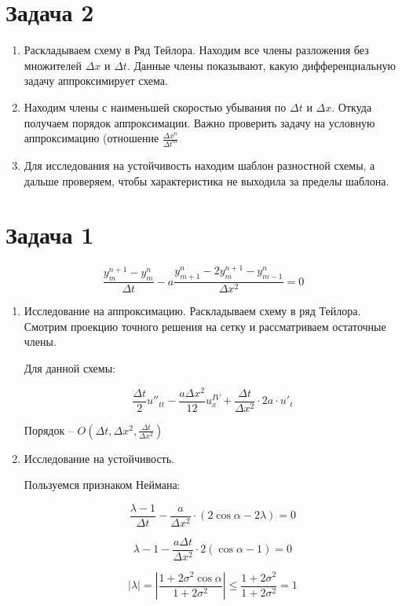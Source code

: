 \documentclass[10pt,a4paper]{article}
\begin{document}
	\section{Задача 2}
	
		\begin{enumerate}
			\item Раскладываем схему в Ряд Тейлора. Находим все члены разложения
			без множителей $\Delta x$ и $\Delta t$. Данные члены показывают, 
			какую дифференциальную задачу аппроксимирует схема.
			\item Находим члены с наименьшей скоростью убывания по $\Delta t$ и 
			$\Delta x$. Откуда получаем порядок аппроксимации. Важно проверить 
			задачу на условную аппроксимацию (отношение $\frac{\Delta x^{n}}
			{\Delta t^{m}}$
			\item Для исследования на устойчивость находим шаблон разностной 
			схемы, а дальше проверяем, чтобы характеристика не выходила за 
			пределы шаблона.
		\end{enumerate}
		
	\section{Задача 1}
		\begin{equation}
			\frac{y^{n+1}_{m} - y^{n}_{m}}{\Delta t} - a
			\frac{y^{n}_{m + 1} - 2y^{n + 1}_{m} - y^{n}_{m - 1}}{\Delta x^{2}}
			= 0
		\end{equation}
		
		\begin{enumerate}
			\item Исследование на аппроксимацию. Раскладываем схему в ряд 
			Тейлора. Смотрим проекцию точного решения на сетку и рассматриваем 
			остаточные члены.
			
			Для данной схемы:
			
			\begin{equation}
				\frac{\Delta t}{2}u''_{tt} - \frac{a\Delta x^{2}}{12}u^{IV}_{x}
				+ \frac{\Delta t}{\Delta x^{2}}\cdot 2a\cdot u'_{t}
			\end{equation}
			
			Порядок -- $O\left(\Delta t, \Delta x^{2}, \frac{\Delta t}
			{\Delta x^{2}}\right)$
			
			\item Исследование на устойчивость.
			
			Пользуемся признаком Неймана:
			
			\begin{equation}
				\frac{\lambda - 1}{\Delta t} - \frac{a}{\Delta x^{2}}\cdot
				\left(2\cos\alpha - 2\lambda\right) = 0
			\end{equation}
			
			\begin{equation}
				\lambda - 1 - \frac{a\Delta t}{\Delta x^{2}}\cdot 2\left(
				\cos\alpha - 1\right) = 0
			\end{equation}
			
			\begin{equation}
				\left|\lambda\right| = 
				\left|\frac{1 + 2\sigma^{2}\cos\alpha}{1 + 2\sigma^{2}}\right|
				\leqslant \frac{1 + 2\sigma^{2}}{1 + 2\sigma^{2}} = 1
			\end{equation}
		\end{enumerate}
\end{document}
